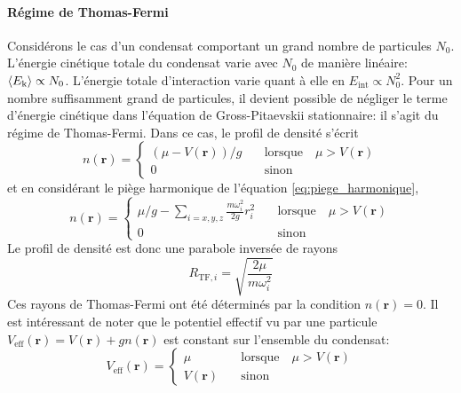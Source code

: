 \paragraph*{Régime de Thomas-Fermi}
Considérons le cas d'un condensat comportant un grand nombre de particules $N_0$. L'énergie cinétique totale du condensat varie avec $N_0$ de manière linéaire: $\left\langle E_{\mathrm{k}}\right\rangle\propto N_0$. L'énergie totale d'interaction varie quant à elle en $E_{\mathrm{int}}\propto N_0^2$. Pour un nombre suffisamment grand de particules, il devient possible de négliger le terme d'énergie cinétique dans l'équation de Gross-Pitaevskii stationnaire: il s'agit du régime de Thomas-Fermi.
Dans ce cas, le profil de densité s'écrit
\begin{equation}
n(\mathbf{r})=\left\{
					\begin{array}{ll}
						(\mu-V(\mathbf{r}))/g &\quad \text{lorsque} \quad \mu>V(\mathbf{r})\\
						0 &\quad \text{sinon}
					\end{array} 
				\right.
\end{equation}
et en considérant le piège harmonique de l'équation \ref{eq:piege_harmonique},
\begin{equation}
n(\mathbf{r})=\left\{
					\begin{array}{ll}
						\mu/g-\sum_{i=x,y,z}\frac{m\omega_i^2}{2g}r_i^2 &\quad \text{lorsque} \quad \mu>V(\mathbf{r})\\
						0 &\quad \text{sinon}
					\end{array} 
				\right.
\end{equation}
Le profil de densité est donc une parabole inversée de rayons
\begin{equation}
R_{\mathrm{TF},i}=\sqrt{\frac{2\mu}{m\omega_i^2}}
\end{equation}
Ces rayons de Thomas-Fermi ont été déterminés par la condition $n(\mathbf{r})=0$. Il est intéressant de noter que le potentiel effectif vu par une particule $V_{\mathrm{eff}}(\mathbf{r})=V(\mathbf{r})+gn(\mathbf{r})$ est constant sur l'ensemble du condensat:
\begin{equation}
V_{\mathrm{eff}}(\mathbf{r})= \left\{
									\begin{array}{ll}
										\mu &\quad \text{lorsque} \quad \mu>V(\mathbf{r})\\
										V(\mathbf{r}) &\quad \text{sinon}
									\end{array}
							\right.
\end{equation}
